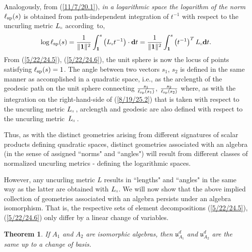 \documentclass{amsart}
\newtheorem{theorem}{Theorem}
\theoremstyle{definition}
\numberwithin{theorem}{section}
\numberwithin{equation}{section}
\begin{document}
Analogously, from (\ref{11/7/20.1}), {\it in a logarithmic space the logarithm of the norm} $\ell_{\rm sp}(s)$ is obtained from path-independent integration of $t^{-1}$ with respect to the uncurling metric $L_{\shortparallel}$ \mbox{according to},
\begin{equation}\label{8/19/25.2} \log\ell_{\rm sp}(s) =  \frac{1}{\|{\bf 1}\|^2} \int_{\bf 1}^s \left(L_{\shortparallel}t^{-1}\right) \cdot \mathbf{d}t =
\frac{1}{\|{\bf 1}\|^2} \int_{\bf 1}^s \left( t^{-1}\right)^T L_{\shortparallel} \mathbf{d}t .\end{equation} 
 From
(\ref{5/22/24.5}), (\ref{5/22/24.6}), the unit sphere is now the locus of points satisfying $\ell_{\rm sp}(s) = 1$.    The angle between two vectors $s_1$, $s_2$ is defined in the same manner as accomplished in a quadratic space, i.e., as the arclength of the geodesic path on the unit sphere connecting $\frac{s_1}{\ell_{\rm sp}(s_1)}$, $\frac{s_2}{\ell_{\rm sp}(s_2)}$ where, as with the integration on the right-hand-side of (\ref{8/19/25.2}) that is taken with respect to the uncurling metric $L_\shortparallel$\,, arclength and geodesic are also defined with respect to the uncurling \mbox{metric $L_{\shortparallel}$}\,.

Thus, as with the distinct geometries arising from different signatures of scalar products defining quadratic spaces, distinct geometries associated with an algebra (in the sense of assigned ``norms" and ``angles") will result from different classes of normalized uncurling metrics - defining the logarithmic spaces.

However, any uncurling metric $L$ results in ``lengths" and ``angles" in the same way as the latter are obtained with $L_\shortparallel$.
We will now show that the above implied collection of geometries associated with an algebra persists under an algebra isomorphism.  That is, the respective sets of element decompositions (\ref{5/22/24.5}), (\ref{5/22/24.6}) only differ by a linear change of variables.

  \begin{theorem}\label{6/6/23.2} 
If $A_1$ and $A_2$ are isomorphic algebras, then $\mathfrak{u}_{A_1}^d$ and  $\mathfrak{u}_{A_2}^d$ are the same up to a change of basis.
 \end{theorem}
\end{document}
